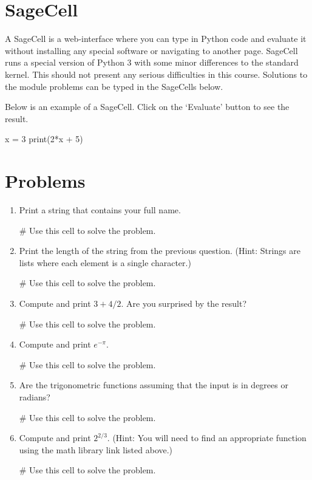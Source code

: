 \documentclass{ximera}
\begin{document}
\section{SageCell}

A SageCell is a web-interface where you can type in Python code and evaluate it without installing any special software or navigating to another page. SageCell runs a special version of Python 3 with some minor differences to the standard kernel. This should not present any serious difficulties in this course. Solutions to the module problems can be typed in the SageCells below.

Below is an example of a SageCell. Click on the `Evaluate' button to see the result.

\begin{sageCell}
x = 3
print(2*x + 5)
\end{sageCell}

\section{Problems}
\begin{enumerate}
    \item Print a string that contains your full name.
\begin{sageCell}
# Use this cell to solve the problem.
\end{sageCell}

    \item Print the length of the string from the previous question. (Hint: Strings are lists where each element is a single character.)
\begin{sageCell}
# Use this cell to solve the problem.
\end{sageCell}

    \item Compute and print $3+4/2$. Are you surprised by the result?
\begin{sageCell}
# Use this cell to solve the problem.
\end{sageCell}

    \item Compute and print $e^{-\pi}$.
\begin{sageCell}
# Use this cell to solve the problem.
\end{sageCell}

    \item Are the trigonometric functions assuming that the input is in degrees or radians?
\begin{sageCell}
# Use this cell to solve the problem.
\end{sageCell}

    \item Compute and print $2^{2/3}$. (Hint: You will need to find an appropriate function using the math library link listed above.)
\begin{sageCell}
# Use this cell to solve the problem.
\end{sageCell}

\end{enumerate}
\end{document}
